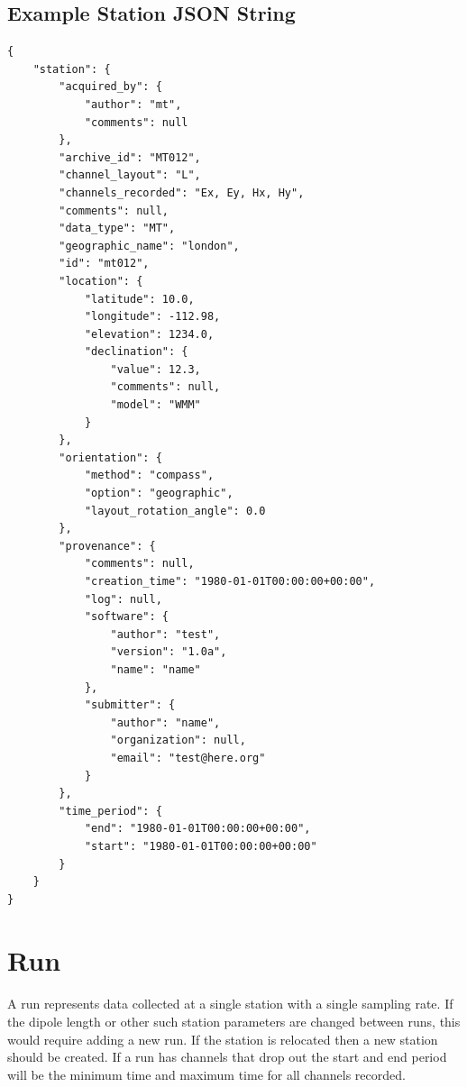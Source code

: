 \documentclass{article}
\begin{document}
\newpage
\subsection{Example Station JSON String}

\begin{verbatim}
{
    "station": {
        "acquired_by": {
            "author": "mt",
            "comments": null
        },
        "archive_id": "MT012",
        "channel_layout": "L",
        "channels_recorded": "Ex, Ey, Hx, Hy",
        "comments": null,
        "data_type": "MT",
        "geographic_name": "london",
        "id": "mt012",
        "location": {
            "latitude": 10.0,
            "longitude": -112.98,
            "elevation": 1234.0,
            "declination": {
                "value": 12.3,
                "comments": null,
                "model": "WMM"
            }
        },
        "orientation": {
            "method": "compass",
            "option": "geographic",
            "layout_rotation_angle": 0.0
        },
        "provenance": {
            "comments": null,
            "creation_time": "1980-01-01T00:00:00+00:00",
            "log": null,
            "software": {
                "author": "test",
                "version": "1.0a",
                "name": "name"
            },
            "submitter": {
                "author": "name",
                "organization": null,
                "email": "test@here.org"
            }
        },
        "time_period": {
            "end": "1980-01-01T00:00:00+00:00",
            "start": "1980-01-01T00:00:00+00:00"
        }
    }
}
\end{verbatim}

\newpage
\section{Run}

A run represents data collected at a single station with a single sampling rate. If the dipole length or other such station parameters are changed between runs, this would require adding a new run.  If the station is relocated then a new station should be created.  If a run has channels that drop out the start and end period will be the minimum time and maximum time for all channels recorded.
\end{document}
